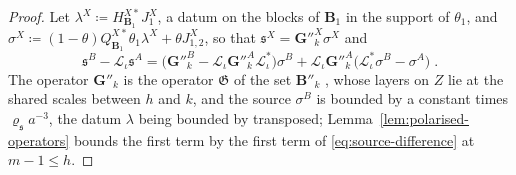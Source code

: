 \begin{proof}
Let $\lambda^X \coloneqq H^{X*}_{\mathbf B_1}J^X_1$, a datum on the blocks of $\mathbf B_1$ in the support of $\theta_1$, and $\sigma^X \coloneqq (1 - \theta)Q^{X*}_{\mathbf B_1}\theta_1\lambda^X + \theta J^X_{1,2}$, so that $\mathfrak s^X = \mathbf G''^X_k\sigma^X$ and
\[
    \mathfrak s^B - \mathcal L_\iota\mathfrak s^A = \bigl(\mathbf G''^B_k - \mathcal L_\iota\mathbf G''^A_k\mathcal L_\iota^*\bigr)\sigma^B + \mathcal L_\iota\mathbf G''^A_k\bigl(\mathcal L_\iota^*\sigma^B - \sigma^A\bigr)\;.
\]
The operator $\mathbf G''_k$ is the operator $\mathfrak G$ of the set $\mathbf B''_k$ \cite[p.~370, l.~49]{BalabanLFR2}, whose layers on $Z$ lie at the shared scales between $h$ and $k$, and the source $\sigma^B$ is bounded by a constant times $\varrho_{\mathfrak s}a^{-3}$, the datum $\lambda$ being bounded by \cite[(3.133)]{BalabanPBG} transposed; Lemma~\ref{lem:polarised-operators} bounds the first term by the first term of \eqref{eq:source-difference} at $m - 1 \leq h$.


\end{proof}
